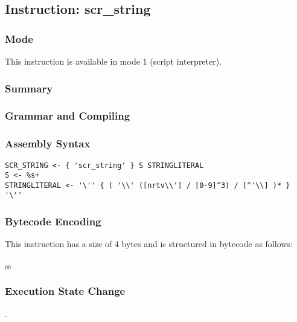 \subsection{Instruction: scr\_string}

\subsubsection{Mode}
This instruction is available in mode 1 (script interpreter).
\subsubsection{Summary}


\subsubsection{Grammar and Compiling}


\subsubsection{Assembly Syntax}

\begin{myquote}
\begin{verbatim}
SCR_STRING <- { 'scr_string' } S STRINGLITERAL
S <- %s+
STRINGLITERAL <- '\'' { ( '\\' ([nrtv\\'] / [0-9]^3) / [^'\\] )* } '\''
\end{verbatim}
\end{myquote}

\subsubsection{Bytecode Encoding}

This instruction has a size of 4 bytes and is structured in bytecode as follows:

$_{00}$\ 


\subsubsection{Execution State Change}

.


